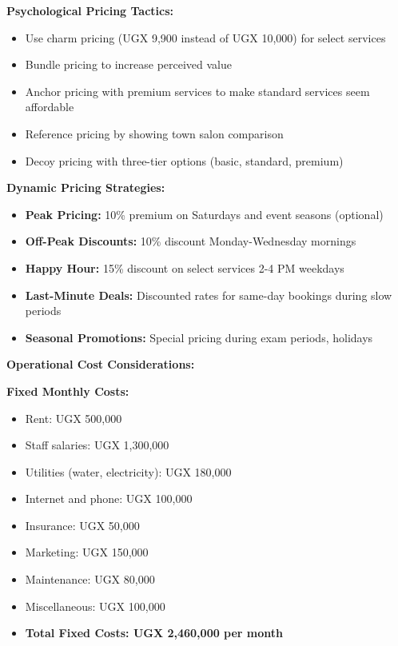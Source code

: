\textbf{Psychological Pricing Tactics:}
\begin{itemize}[leftmargin=2em]
    \item Use charm pricing (UGX 9,900 instead of UGX 10,000) for select services
    \item Bundle pricing to increase perceived value
    \item Anchor pricing with premium services to make standard services seem affordable
    \item Reference pricing by showing town salon comparison
    \item Decoy pricing with three-tier options (basic, standard, premium)
\end{itemize}

\textbf{Dynamic Pricing Strategies:}
\begin{itemize}[leftmargin=2em]
    \item \textbf{Peak Pricing:} 10\% premium on Saturdays and event seasons (optional)
    \item \textbf{Off-Peak Discounts:} 10\% discount Monday-Wednesday mornings
    \item \textbf{Happy Hour:} 15\% discount on select services 2-4 PM weekdays
    \item \textbf{Last-Minute Deals:} Discounted rates for same-day bookings during slow periods
    \item \textbf{Seasonal Promotions:} Special pricing during exam periods, holidays
\end{itemize}

\vspace{1em}

\textbf{Operational Cost Considerations:}

\textbf{Fixed Monthly Costs:}
\begin{itemize}[leftmargin=2em]
    \item Rent: UGX 500,000
    \item Staff salaries: UGX 1,300,000
    \item Utilities (water, electricity): UGX 180,000
    \item Internet and phone: UGX 100,000
    \item Insurance: UGX 50,000
    \item Marketing: UGX 150,000
    \item Maintenance: UGX 80,000
    \item Miscellaneous: UGX 100,000
    \item \textbf{Total Fixed Costs: UGX 2,460,000 per month}
\end{itemize}

